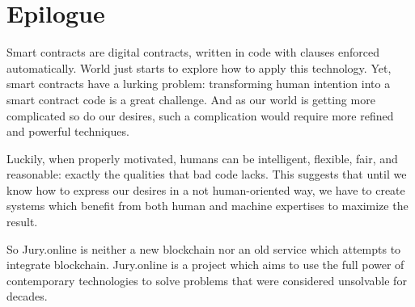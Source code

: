 \documentclass[12pt]{article}
\begin{document}

%
%
%
\section{Epilogue}
Smart contracts are digital contracts, written in code with clauses enforced automatically. World just starts to explore how to apply this technology. 
Yet, smart contracts have a lurking problem: transforming human intention into a smart contract code is a great challenge. And as our world
is getting more complicated so do our desires, such a complication would require more refined and powerful techniques.

Luckily, when properly motivated, humans can be intelligent, flexible, fair, and reasonable: exactly the qualities that bad code lacks. This
suggests that until we know how to express our desires in a not human-oriented way, we have to create systems which benefit from both human
and machine expertises to maximize the result.

So Jury.online is neither a new blockchain nor an old service which attempts to integrate blockchain. Jury.online is a project which aims to
use the full power of contemporary technologies to solve problems that were considered unsolvable for decades.


 
\end{document}
